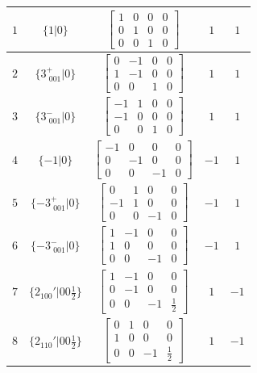 \documentclass[fleqn,8pt]{jsarticle}
\begin{document}
\begin{longtable}{ccccc}
$ 1 $ & $ \{1|0\} $ & $ \begin{bmatrix} 1 & 0 & 0 & 0 \\ 0 & 1 & 0 & 0 \\ 0 & 0 & 1 & 0 \end{bmatrix} $ & $ 1 $ & $ 1 $ \\ \hline
$ 2 $ & $ \{3^{+}_{\,\,001}|0\} $ & $ \begin{bmatrix} 0 & -1 & 0 & 0 \\ 1 & -1 & 0 & 0 \\ 0 & 0 & 1 & 0 \end{bmatrix} $ & $ 1 $ & $ 1 $ \\ \hline
$ 3 $ & $ \{3^{-}_{\,\,001}|0\} $ & $ \begin{bmatrix} -1 & 1 & 0 & 0 \\ -1 & 0 & 0 & 0 \\ 0 & 0 & 1 & 0 \end{bmatrix} $ & $ 1 $ & $ 1 $ \\ \hline
$ 4 $ & $ \{-1|0\} $ & $ \begin{bmatrix} -1 & 0 & 0 & 0 \\ 0 & -1 & 0 & 0 \\ 0 & 0 & -1 & 0 \end{bmatrix} $ & $ -1 $ & $ 1 $ \\ \hline
$ 5 $ & $ \{-3^{+}_{\,\,001}|0\} $ & $ \begin{bmatrix} 0 & 1 & 0 & 0 \\ -1 & 1 & 0 & 0 \\ 0 & 0 & -1 & 0 \end{bmatrix} $ & $ -1 $ & $ 1 $ \\ \hline
$ 6 $ & $ \{-3^{-}_{\,\,001}|0\} $ & $ \begin{bmatrix} 1 & -1 & 0 & 0 \\ 1 & 0 & 0 & 0 \\ 0 & 0 & -1 & 0 \end{bmatrix} $ & $ -1 $ & $ 1 $ \\ \hline
$ 7 $ & $ \{2{}_{100}{}'|0 0 \frac{1}{2}\} $ & $ \begin{bmatrix} 1 & -1 & 0 & 0 \\ 0 & -1 & 0 & 0 \\ 0 & 0 & -1 & \frac{1}{2} \end{bmatrix} $ & $ 1 $ & $ -1 $ \\ \hline
$ 8 $ & $ \{2{}_{110}{}'|0 0 \frac{1}{2}\} $ & $ \begin{bmatrix} 0 & 1 & 0 & 0 \\ 1 & 0 & 0 & 0 \\ 0 & 0 & -1 & \frac{1}{2} \end{bmatrix} $ & $ 1 $ & $ -1 $ \\ \hline

\end{longtable}
\end{document}
